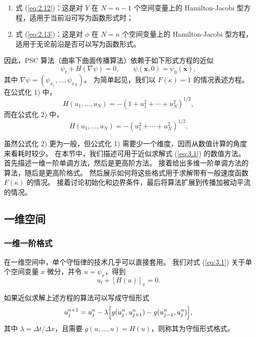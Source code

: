 \documentclass[11pt,a4paper]{article}
\begin{document}
\begin{enumerate}[label=\arabic*)]
    \item 式 (\ref{eq:2.12})：这是对 $Y$ 在 $N = n-1$ 个空间变量上的 Hamilton-Jacobi 型方程，适用于当前沿可写为函数形式时；
    \item 式 (\ref{eq:2.13})：这是对 $\phi$ 在 $N = n$ 个空间变量上的 Hamilton-Jacobi 型方程，适用于无论前沿是否可以写为函数形式。
\end{enumerate}

因此，PSC 算法（曲率下曲面传播算法）依赖于如下形式方程的近似
\begin{equation}
\psi_t + H(\nabla\psi) = 0,\qquad \psi(\mathbf{x},0) = \psi_0(\mathbf{x}),
\label{eq:3.1}
\end{equation}
其中 $\nabla\psi = (\psi_{x_1}, \ldots, \psi_{x_N})$。
为简单起见，我们以 $F(\kappa) = 1$ 的情况表述方程。
在公式化 1) 中，
\begin{equation}
H(u_1, \ldots, u_N) = -(1 + u_1^2 + \cdots + u_N^2)^{1/2},
\label{eq:3.2}
\end{equation}
而在公式化 2) 中，
\begin{equation}
H(u_1, \ldots, u_N) = -(u_1^2 + \cdots + u_N^2)^{1/2}.
\label{eq:3.3}
\end{equation}

虽然公式化 2) 更为一般，但公式化 1) 需要少一个维度，因而从数值计算的角度来看耗时较少。
在本节中，我们描述可用于近似求解式 (\ref{eq:3.1}) 的数值方法。
首先描述一维一阶单调方法，然后是更高阶方法。
接着给出多维一阶单调方法的算法，随后是更高阶格式。
然后展示如何将这些格式用于求解带有一般速度函数 $F(\kappa)$ 的情况。
接着讨论初始化和边界条件，最后将算法扩展到传播加被动平流的情况。

\subsection{一维空间}

\subsubsection{一维一阶格式}

在一维空间中，单个守恒律的技术几乎可以直接套用。
我们对式 (\ref{eq:3.1}) 关于单个空间变量 $x$ 微分，并令 $u = \psi_x$，得到
\begin{equation}
u_t + [H(u)]_x = 0.
\label{eq:3.4}
\end{equation}

如果近似求解上述方程的算法可以写成守恒形式
\begin{equation}
u_j^{n+1} = u_j^n - \lambda\Bigl[g(u_j^n, u_{j+1}^n) - g(u_{j-1}^n, u_j^n)\Bigr],
\label{eq:3.5}
\end{equation}
其中 $\lambda = \Delta t/\Delta x$，且需要 $g(u,\ldots,u) = H(u)$，则称其为守恒形式格式。
\end{document}
